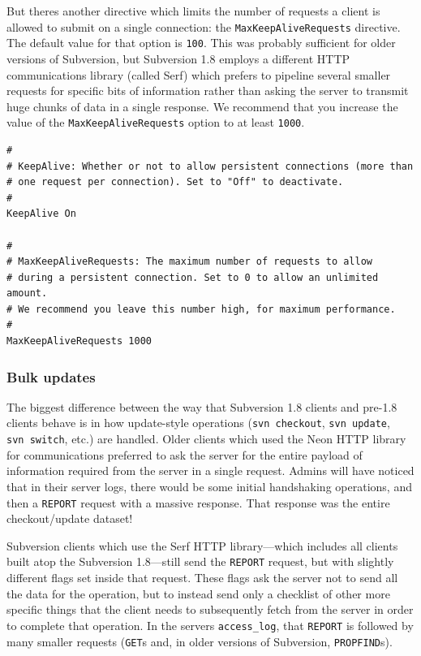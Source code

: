 But there\textquotesingle s another directive which limits the number of
requests a client is allowed to submit on a single connection: the
\texttt{MaxKeepAliveRequests} directive. The default value for that
option is \texttt{100}. This was probably sufficient for older versions
of Subversion, but Subversion 1.8 employs a different HTTP
communications library (called Serf) which prefers to pipeline several
smaller requests for specific bits of information rather than asking the
server to transmit huge chunks of data in a single response. We
recommend that you increase the value of the
\texttt{MaxKeepAliveRequests} option to at least \texttt{1000}.

\begin{verbatim}
#
# KeepAlive: Whether or not to allow persistent connections (more than
# one request per connection). Set to "Off" to deactivate.
#
KeepAlive On

#
# MaxKeepAliveRequests: The maximum number of requests to allow
# during a persistent connection. Set to 0 to allow an unlimited amount.
# We recommend you leave this number high, for maximum performance.
#
MaxKeepAliveRequests 1000
\end{verbatim}

\subsubsection{Bulk
updates}\label{svn.serverconfig.httpd.perf.bulk-updates}

The biggest difference between the way that Subversion 1.8 clients and
pre-1.8 clients behave is in how update-style operations
(\texttt{svn\ checkout}, \texttt{svn\ update}, \texttt{svn\ switch},
etc.) are handled. Older clients which used the Neon HTTP library for
communications preferred to ask the server for the entire payload of
information required from the server in a single request. Admins will
have noticed that in their server logs, there would be some initial
handshaking operations, and then a \texttt{REPORT} request with a
massive response. That response was the entire checkout/update dataset!

Subversion clients which use the Serf HTTP library---which includes all
clients built atop the Subversion 1.8---still send the \texttt{REPORT}
request, but with slightly different flags set inside that request.
These flags ask the server not to send all the data for the operation,
but to instead send only a checklist of other more specific things that
the client needs to subsequently fetch from the server in order to
complete that operation. In the server\textquotesingle s
\texttt{access\_log}, that \texttt{REPORT} is followed by many smaller
requests (\texttt{GET}s and, in older versions of Subversion,
\texttt{PROPFIND}s).

